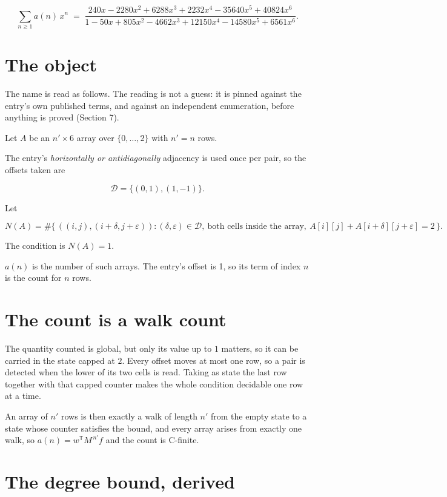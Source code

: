 \documentclass[11pt]{article}
\theoremstyle{definition}
\begin{document}
\[\sum_{n \ge 1} a(n)\,x^n \;=\; \frac{240x - 2280x^{2} + 6288x^{3} + 2232x^{4} - 35640x^{5} + 40824x^{6}}{1 - 50x + 805x^{2} - 4662x^{3} + 12150x^{4} - 14580x^{5} + 6561x^{6}}.\]

\section{The object}

The name is read as follows. The reading is not a guess: it is pinned against the entry's own published terms, and against an independent enumeration, before anything is proved (Section 7).

Let $A$ be an $n' \times 6$ array over $\{0,\dots,2\}$ with $n' = n$ rows.

The entry's {\itshape horizontally or antidiagonally} adjacency is used once per pair, so the offsets taken are

\[\mathcal{D} = \{(0,1), (1,-1)\}.\]

Let

\[N(A) = \#\bigl\{\,((i,j),(i{+}\delta,j{+}\varepsilon)) : (\delta,\varepsilon) \in \mathcal{D},\ \text{both cells inside the array},\ A[i][j] + A[i{+}\delta][j{+}\varepsilon] = 2\,\bigr\}.\]

The condition is $N(A) = 1$.

$a(n)$ is the number of such arrays. The entry's offset is 1, so its term of index $n$ is the count for $n$ rows.

\section{The count is a walk count}

The quantity counted is global, but only its value up to $1$ matters, so it can be carried in the state capped at $2$. Every offset moves at most one row, so a pair is detected when the lower of its two cells is read. Taking as state the last row together with that capped counter makes the whole condition decidable one row at a time.

An array of $n'$ rows is then exactly a walk of length $n'$ from the empty state to a state whose counter satisfies the bound, and every array arises from exactly one walk, so $a(n) = w^{\mathsf T}M^{\,n'}f$ and the count is C-finite.

\section{The degree bound, derived}
\end{document}

